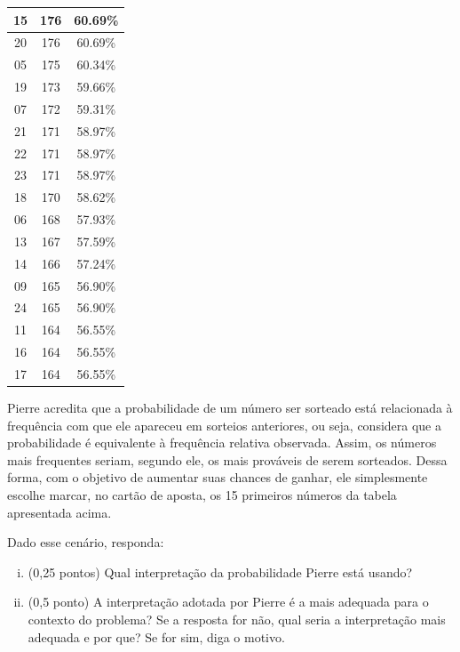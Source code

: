 \documentclass[12pt]{article}
\begin{document}
\begin{enumerate}[a)]
\begin{table}[H]
\begin{tabular}{|c|c|c|}
15 & 176 & 60.69\% \\ \hline
20 & 176 & 60.69\% \\ \hline
05 & 175 & 60.34\% \\ \hline
19 & 173 & 59.66\% \\ \hline
07 & 172 & 59.31\% \\ \hline
21 & 171 & 58.97\% \\ \hline
22 & 171 & 58.97\% \\ \hline
23 & 171 & 58.97\% \\ \hline
18 & 170 & 58.62\% \\ \hline
06 & 168 & 57.93\% \\ \hline
13 & 167 & 57.59\% \\ \hline
14 & 166 & 57.24\% \\ \hline
09 & 165 & 56.90\% \\ \hline
24 & 165 & 56.90\% \\ \hline
11 & 164 & 56.55\% \\ \hline
16 & 164 & 56.55\% \\ \hline
17 & 164 & 56.55\% \\ \hline
\hline
\end{tabular}
\end{table}

Pierre acredita que a probabilidade de um número ser sorteado está relacionada à frequência com que ele apareceu em sorteios anteriores, ou seja, considera que a probabilidade é equivalente à frequência relativa observada. 
Assim, os números mais frequentes seriam, segundo ele, os mais prováveis de serem sorteados. Dessa forma, com o objetivo de aumentar suas chances de ganhar, ele simplesmente escolhe marcar, no cartão de aposta, os 15 primeiros números da tabela apresentada acima.

Dado esse cenário, responda:

\begin{enumerate}[i)]
    \item (0,25 pontos) Qual interpretação da probabilidade Pierre está usando? 
    \item (0,5 ponto) A interpretação adotada por Pierre é a mais adequada para o contexto do problema? Se a resposta for não, qual seria a interpretação mais adequada e por que? Se for sim, diga o motivo. 
\end{enumerate}

\vspace{5px}





\end{enumerate}
\end{document}
